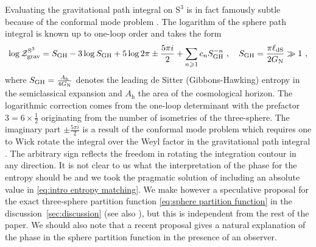 \documentclass[12pt,a4paper]{article}
\renewcommand{\geq}{\geqslant}
\begin{document}
Evaluating the gravitational path integral on $\mathrm{S}^3$ is in fact famously subtle because of the conformal mode problem \cite{Gibbons:1978ac}. The logarithm of the sphere path integral is known up to one-loop order and takes the form \cite{Anninos:2020hfj, Carlip:1992wg, Guadagnini:1994ahx, Castro:2012gc, Anninos:2022hqo, Anninos:2021ihe} 
\begin{equation}
    \log \mathcal{Z}_{\rm grav}^{\text{S}^3}  = S_{\rm GH} - 3\log S_{\rm GH} + 5 \log 2\pi \pm \frac{5\pi i}{2}+ \sum_{n\geq 1} c_n S_{\rm GH}^{-n}~,\quad S_{\rm GH} = \frac{\pi \ell_{\rm dS}}{2G_{\text{N}}}\gg 1~, \label{eq:sphere partition function}
\end{equation}
where $S_{\rm GH}=\frac{A_\text{h}}{4 G_{\text{N}}}$ denotes the leading de Sitter (Gibbons-Hawking) entropy in the semiclassical expansion and $A_\text{h}$ the area of the cosmological horizon. The logarithmic correction comes from the one-loop determinant with the prefactor $3=6 \times \frac{1}{2}$ originating from the number of isometries of the three-sphere. The imaginary part $\pm \frac{5\pi i}{2}$ is a result of the conformal mode problem which requires one to Wick rotate the integral over the Weyl factor in the gravitational path integral \cite{Polchinski:1988ua}. The arbitrary sign reflects the freedom in rotating the integration contour in any direction. 
It is not clear to us what the interpretation of the phase for the entropy should be and we took the pragmatic solution of including an absolute value in \eqref{eq:intro entropy matching}. 
We make however a speculative proposal for the exact three-sphere partition function \eqref{eq:sphere partition function} in the discussion~\ref{sec:discussion} (see also \cite{Anninos:2020hfj}), but this is independent from the rest of the paper.
We should also note that a recent proposal \cite{Maldacena:2024spf} gives a natural explanation of the phase in the sphere partition function in the presence of an observer.
\end{document}
